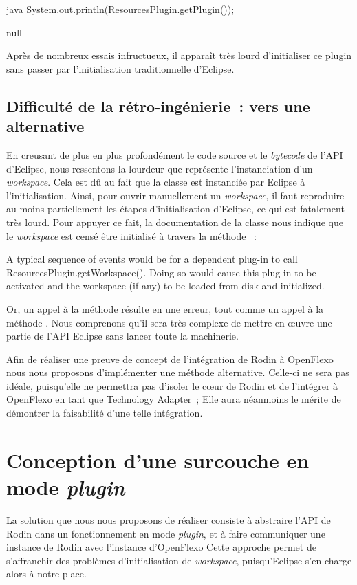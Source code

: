\begin{imtaCode}{java}
System.out.println(ResourcesPlugin.getPlugin());
\end{imtaCode}
\vspace{-0.5cm}
\begin{imtaConsole}
null
\end{imtaConsole}

Après de nombreux essais infructueux, il apparaît très lourd d'initialiser ce plugin sans passer par l'initialisation traditionnelle d'Eclipse.


\subsection{Difficulté de la rétro-ingénierie~: vers une alternative}

En creusant de plus en plus profondément le code source et le \textit{bytecode} de l'API d'Eclipse, nous ressentons la lourdeur que représente l'instanciation d'un \textit{workspace}.
Cela est dû au fait que la classe  est instanciée par Eclipse à l'initialisation.
Ainsi, pour ouvrir manuellement un \textit{workspace}, il faut reproduire au moins partiellement les étapes d'initialisation d'Eclipse, ce qui est fatalement très lourd.
Pour appuyer ce fait, la documentation de la classe  \cite{eclipseresourcesplugin} nous indique que le \textit{workspace} est censé être initialisé à travers la méthode %
~:\\

\begin{imtaQuote}
A typical sequence of events would be for a dependent plug-in to call\\ResourcesPlugin.getWorkspace().
Doing so would cause this plug-in to be activated and the workspace (if any) to be loaded from disk and initialized.
\end{imtaQuote}

Or, un appel à la méthode  résulte en une erreur, tout comme un appel à la méthode .
Nous comprenons qu'il sera très complexe de mettre en œuvre une partie de l'API Eclipse sans lancer toute la machinerie.

Afin de réaliser une preuve de concept de l'intégration de Rodin à OpenFlexo nous nous proposons d'implémenter une méthode alternative.
Celle-ci ne sera pas idéale, puisqu'elle ne permettra pas d'isoler le cœur de Rodin et de l'intégrer à OpenFlexo en tant que Technology Adapter~; %
Elle aura néanmoins le mérite de démontrer la faisabilité d'une telle intégration.


\section{Conception d'une surcouche en mode \textit{plugin}}

La solution que nous nous proposons de réaliser consiste à abstraire l'API de Rodin dans un fonctionnement en mode \textit{plugin}, et à faire communiquer une instance de Rodin %
avec l'instance d'OpenFlexo
Cette approche permet de s'affranchir des problèmes d'initialisation de \textit{workspace}, puisqu'Eclipse s'en charge alors à notre place.

